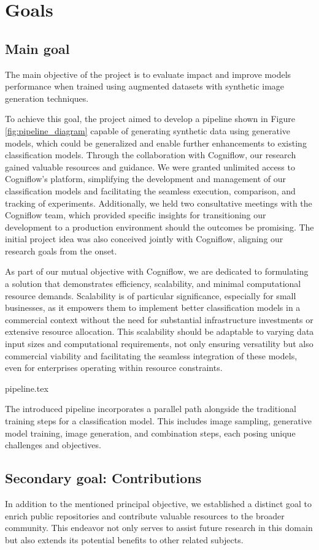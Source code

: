 \chapter{Goals}

\section{Main goal}

The main objective of the project is to evaluate impact and improve models performance when trained using augmented datasets with synthetic image generation techniques. 

To achieve this goal, the project aimed to develop a pipeline shown in Figure \ref{fig:pipeline_diagram} capable of generating synthetic data using generative models, which could be generalized and enable further enhancements to existing classification models. Through the collaboration with Cogniflow, our research gained valuable resources and guidance. We were granted unlimited access to Cogniflow's platform, simplifying the development and management of our classification models and facilitating the seamless execution, comparison, and tracking of experiments. Additionally, we held two consultative meetings with the Cogniflow team, which provided specific insights for transitioning our development to a production environment should the outcomes be promising. The initial project idea was also conceived jointly with Cogniflow, aligning our research goals from the onset. 

As part of our mutual objective with Cogniflow, we are dedicated to formulating a solution that demonstrates efficiency, scalability, and minimal computational resource demands. Scalability is of particular significance, especially for small businesses, as it empowers them to implement better classification models in a commercial context without the need for substantial infrastructure investments or extensive resource allocation. This scalability should be adaptable to varying data input sizes and computational requirements, not only ensuring versatility but also commercial viability and facilitating the seamless integration of these models, even for enterprises operating within resource constraints.

{pipeline.tex}

The introduced pipeline incorporates a parallel path alongside the traditional training steps for a classification model. This includes image sampling, generative model training, image generation, and combination steps, each posing unique challenges and objectives.

\section{Secondary goal: Contributions}

In addition to the mentioned principal objective, we established a distinct goal to enrich public repositories and contribute valuable resources to the broader community. This endeavor not only serves to assist future research in this domain but also extends its potential benefits to other related subjects.
